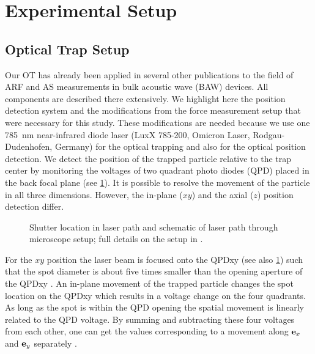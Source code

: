 \section{Experimental Setup\label{sec:TC-experimental-setup}}

\subsection{Optical Trap Setup}

Our OT has already been applied in several other publications 
\cite{Lamprecht2021,Lamprecht2017,Lamprecht2016,Lakaemper2015} to the field of 
ARF and AS measurements in bulk acoustic wave (BAW) devices. All components are 
described there extensively. We highlight here the position detection system 
and the modifications from the force measurement setup that were necessary for 
this study. These modifications are needed because we use one \SI{785}{\nm} 
near-infrared diode laser (LuxX 785-200, Omicron Laser, Rodgau-Dudenhofen, 
Germany) for the optical trapping and also for the optical position detection.  
We detect the position of the trapped particle relative to the trap center by 
monitoring the voltages of two quadrant photo diodes (QPD) placed in the back 
focal plane (see \cref{fig:TC-laserpath}). It is possible to resolve the movement 
of the particle in all three dimensions. However, the in-plane ($xy$) and the 
axial ($z$) position detection differ.

\begin{figure}[H]
  \centering
  \def\svgwidth{85mm}
  {\small
  }
  \caption{Shutter location in laser path and schematic of laser path through 
  microscope setup; full details on the setup in 
  \cite{Lamprecht2016,Lamprecht2017}.}\label{fig:TC-laserpath}
\end{figure}

For the $xy$ position the laser beam is focused onto the QPDxy (see also 
\cref{fig:TC-laserpath}) such that the spot diameter is about five times smaller 
than the opening aperture of the QPDxy \cite{Lamprecht2017}. An in-plane 
movement of the trapped particle changes the spot location on the QPDxy which 
results in a voltage change on the four quadrants. As long as the spot is 
within the QPD opening the spatial movement is linearly related to the QPD 
voltage. By summing and subtracting these four voltages from each other, one 
can get the values corresponding to a movement along $\vb{e}_{x}$ and $\vb{e}_{y}$ separately 
\cite{Lamprecht2017}.

